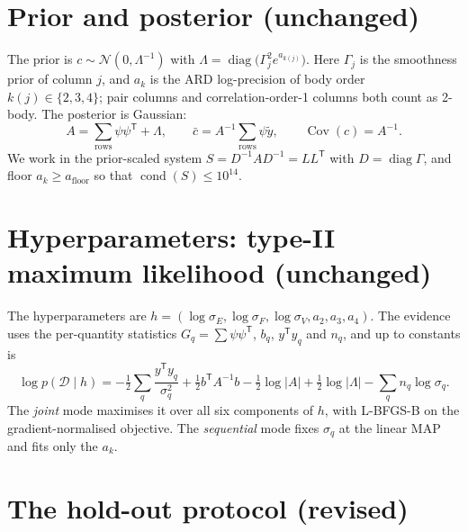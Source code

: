 \documentclass[11pt,a4paper]{article}
\newcommand{\T}{\mathsf{T}}
\newcommand{\cbar}{\bar{c}}
\begin{document}
\section{Prior and posterior (unchanged)}

The prior is $c\sim\mathcal{N}(0,\Lambda^{-1})$ with $\Lambda=\operatorname{diag}\big(\Gamma_j^2 e^{a_{k(j)}}\big)$.
Here $\Gamma_j$ is the smoothness prior of column $j$, and $a_k$ is the ARD log-precision of body
order $k(j)\in\{2,3,4\}$; pair columns and correlation-order-1 columns both count as 2-body. The
posterior is Gaussian:
\begin{equation}
A=\sum_{\text{rows}}\psi\psi^\T+\Lambda,\qquad \cbar = A^{-1}\sum_{\text{rows}}\psi\tilde y,\qquad
\operatorname{Cov}(c)=A^{-1}.
\end{equation}
We work in the prior-scaled system $S=D^{-1}AD^{-1}=LL^\T$ with $D=\operatorname{diag}\Gamma$, and
floor $a_k\ge a_{\mathrm{floor}}$ so that $\operatorname{cond}(S)\le10^{14}$.

\section{Hyperparameters: type-II maximum likelihood (unchanged)}

The hyperparameters are $h=(\log\sigma_E,\log\sigma_F,\log\sigma_V,a_2,a_3,a_4)$. The evidence uses
the per-quantity statistics $G_q=\sum\psi\psi^\T$, $b_q$, $y^\T y_q$ and $n_q$, and up to constants is
\begin{equation}
\log p(\mathcal D\mid h) = -\tfrac12\sum_q\frac{y^\T y_q}{\sigma_q^2}
+\tfrac12 b^\T A^{-1}b-\tfrac12\log|A|+\tfrac12\log|\Lambda|-\sum_q n_q\log\sigma_q .
\end{equation}
The \emph{joint} mode maximises it over all six components of $h$, with L-BFGS-B on the
gradient-normalised objective. The \emph{sequential} mode fixes $\sigma_q$ at the linear MAP and
fits only the $a_k$.

\section{The hold-out protocol (revised)}\label{sec:holdout}
\end{document}
